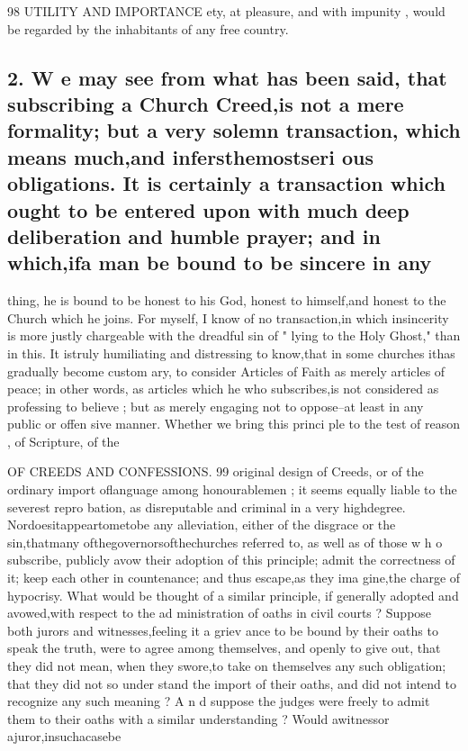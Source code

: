 \documentclass[
]{book}
\begin{document}
98 UTILITY AND IMPORTANCE
ety, at pleasure, and with impunity , would be regarded by the inhabitants of any free country.

\hypertarget{w-e-may-see-from-what-has-been-said-that-subscribing-a-church-creedis-not-a-mere-formality-but-a-very-solemn-transaction-which-means-muchand-infersthemostseri-ous-obligations.-it-is-certainly-a-transaction-which-ought-to-be-entered-upon-with-much-deep-deliberation-and-humble-prayer-and-in-whichifa-man-be-bound-to-be-sincere-in-any}{%
\subsection{2. W e may see from what has been said, that subscribing a Church Creed,is not a mere formality; but a very solemn transaction, which means much,and infersthemostseri ous obligations. It is certainly a transaction which ought to be entered upon with much deep deliberation and humble prayer; and in which,ifa man be bound to be sincere in any}\label{w-e-may-see-from-what-has-been-said-that-subscribing-a-church-creedis-not-a-mere-formality-but-a-very-solemn-transaction-which-means-muchand-infersthemostseri-ous-obligations.-it-is-certainly-a-transaction-which-ought-to-be-entered-upon-with-much-deep-deliberation-and-humble-prayer-and-in-whichifa-man-be-bound-to-be-sincere-in-any}}

thing, he is bound to be honest to his God, honest to himself,and honest to the Church
which he joins. For myself, I know of no transaction,in which insincerity is more justly
chargeable with the dreadful sin of " lying to the Holy Ghost," than in this. It istruly
humiliating and distressing to know,that in some churches ithas gradually become custom ary, to consider Articles of Faith as merely articles of peace; in other words, as articles which he who subscribes,is not considered as professing to believe ; but as merely engaging not to oppose--at least in any public or offen sive manner. Whether we bring this princi
ple to the test of reason , of Scripture, of the

OF CREEDS AND CONFESSIONS. 99
original design of Creeds, or of the ordinary import oflanguage among honourablemen ; it seems equally liable to the severest repro bation, as disreputable and criminal in a very
highdegree. Nordoesitappeartometobe any alleviation, either of the disgrace or the
sin,thatmany ofthegovernorsofthechurches
referred to, as well as of those w h o subscribe,
publicly avow their adoption of this principle;
admit the correctness of it; keep each other
in countenance; and thus escape,as they ima
gine,the charge of hypocrisy. What would
be thought of a similar principle, if generally adopted and avowed,with respect to the ad
ministration of oaths in civil courts ? Suppose both jurors and witnesses,feeling it a griev ance to be bound by their oaths to speak the truth, were to agree among themselves, and openly to give out, that they did not mean, when they swore,to take on themselves any such obligation; that they did not so under
stand the import of their oaths, and did not intend to recognize any such meaning ? A n d suppose the judges were freely to admit them to their oaths with a similar understanding ? Would awitnessor ajuror,insuchacasebe
\end{document}
